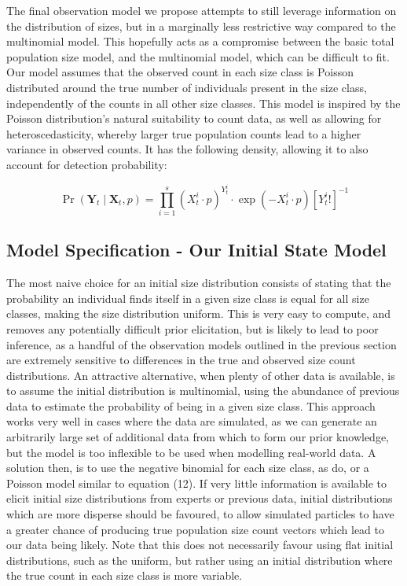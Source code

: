 \documentclass[a4paper,12pt]{article}
\begin{document}
The final observation model we propose attempts to still leverage information on the distribution of sizes, but in a marginally less restrictive way compared to the multinomial model. This hopefully acts as a compromise between the basic total population size model, and the multinomial model, which can be difficult to fit. Our model assumes that the observed count in each size class is Poisson distributed around the true number of individuals present in the size class, independently of the counts in all other size classes. This model is inspired by the Poisson distribution's natural suitability to count data, as well as allowing for heteroscedasticity, whereby larger true population counts lead to a higher variance in observed counts. It has the following density, allowing it to also account for detection probability:

\begin{equation}
     \Pr\left(\boldsymbol{Y}_t\mid\boldsymbol{X}_t, p\right) =  \prod_{i=1}^s \left(X_t^i\cdot p\right)^{Y_t^i}\cdot\exp{\left(-X_t^i\cdot p\right)}\left[Y_t^i!\right]^{-1}
\end{equation}

\subsection{Model Specification - Our Initial State Model}

The most naive choice for an initial size distribution consists of stating that the probability an individual finds itself in a given size class is equal for all size classes, making the size distribution uniform. This is very easy to compute, and removes any potentially difficult prior elicitation, but is likely to lead to poor inference, as a handful of the observation models outlined in the previous section are extremely sensitive to differences in the true and observed size count distributions. An attractive alternative, when plenty of other data is available, is to assume the initial distribution is multinomial, using the abundance of previous data to estimate the probability of being in a given size class. This approach works very well in cases where the data are simulated, as we can generate an arbitrarily large set of additional data from which to form our prior knowledge, but the model is too inflexible to be used when modelling real-world data. A solution then, is to use the negative binomial for each size class, as \citet{Finke} do, or a Poisson model similar to equation (12). If very little information is available to elicit initial size distributions from experts or previous data, initial distributions which are more disperse should be favoured, to allow simulated particles to have a greater chance of producing true population size count vectors which lead to our data being likely. Note that this does not necessarily favour using flat initial distributions, such as the uniform, but rather using an initial distribution where the true count in each size class is more variable.\\
\end{document}
